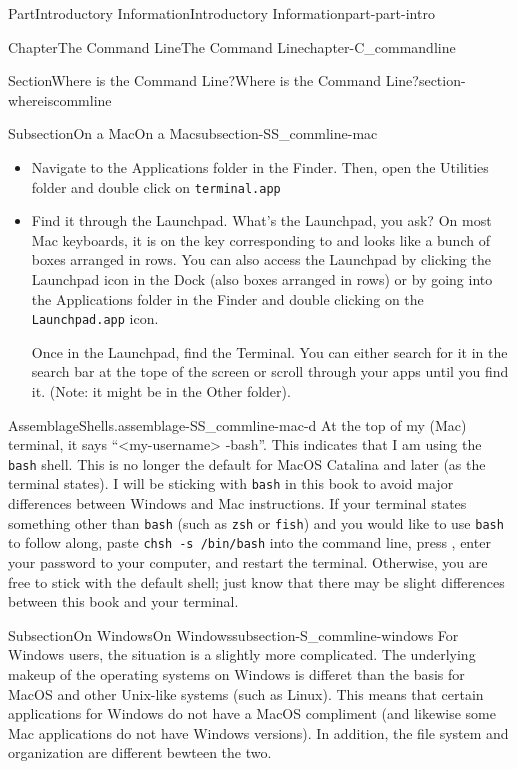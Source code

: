 \documentclass[oneside,10pt,]{book}
\newcommand{\mono}[1]{\texttt{#1}}
\newcommand{\kbd}[1]{\keys{{#1}}}
\begin{document}
\begin{partptx}{Part}{Introductory Information}{}{Introductory Information}{}{}{part-part-intro}
\begin{chapterptx}{Chapter}{The Command Line}{}{The Command Line}{}{}{chapter-C_commandline}
\begin{sectionptx}{Section}{Where is the Command Line?}{}{Where is the Command Line?}{}{}{section-whereiscommline}
\begin{subsectionptx}{Subsection}{On a Mac}{}{On a Mac}{}{}{subsection-SS_commline-mac}
\begin{itemize}[label=\textbullet]
\item{}Navigate to the Applications folder in the Finder. Then, open the Utilities folder and double click on \mono{terminal.app}%
\item{}Find it through the Launchpad. What's the Launchpad, you ask? On most Mac keyboards, it is on the key corresponding to \kbd{F4} and looks like a bunch of boxes arranged in rows. You can also access the Launchpad by clicking the Launchpad icon in the Dock (also boxes arranged in rows) or by going into the Applications folder in the Finder and double clicking on the \mono{Launchpad.app} icon.%
\par
Once in the Launchpad, find the Terminal. You can either search for it in the search bar at the tope of the screen or scroll through your apps until you find it. (Note: it might be in the Other folder).%
\end{itemize}
%
\begin{assemblage}{Assemblage}{Shells.}{assemblage-SS_commline-mac-d}%
At the top of my (Mac) terminal, it says ``\textless{}my-username\textgreater{}\textemdash{} -bash''. This indicates that I am using the \mono{bash} shell. This is no longer the default for MacOS Catalina and later (as the terminal states). I will be sticking with \mono{bash} in this book to avoid major differences between Windows and Mac instructions. If your terminal states something other than \mono{bash} (such as \mono{zsh} or \mono{fish}) and you would like to use \mono{bash} to follow along, paste \mono{chsh -s /bin/bash}\footnotemark{} into the command line, press \kbd{Enter}, enter your password to your computer, and restart the terminal. Otherwise, you are free to stick with the default shell; just know that there may be slight differences between this book and your terminal.%
\end{assemblage}
%
\end{subsectionptx}
%
%
\typeout{************************************************}
\typeout{************************************************}
%
\begin{subsectionptx}{Subsection}{On Windows}{}{On Windows}{}{}{subsection-S_commline-windows}
%
For Windows users, the situation is a slightly more complicated. The underlying makeup of the operating systems on Windows is differet than the basis for MacOS and other Unix-like systems (such as Linux). This means that certain applications for Windows do not have a MacOS compliment (and likewise some Mac applications do not have Windows versions). In addition, the file system and organization are different bewteen the two.%

\end{subsectionptx}
\end{sectionptx}
\end{chapterptx}
\end{partptx}
\end{document}
